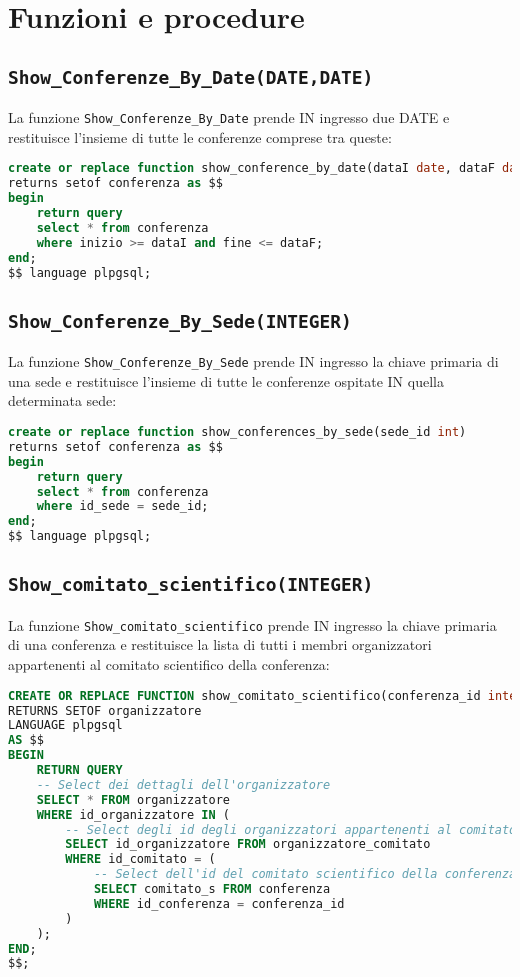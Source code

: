 \section{Funzioni e procedure}
\subsection{\texttt{Show\_Conferenze\_By\_Date(DATE,DATE)}}
La funzione \texttt{Show\_Conferenze\_By\_Date} prende IN ingresso due DATE e restituisce l'insieme di tutte le conferenze comprese tra queste:
\begin{lstlisting}[language=SQL, style=mystyle]
create or replace function show_conference_by_date(dataI date, dataF date)
returns setof conferenza as $$
begin
    return query
    select * from conferenza
    where inizio >= dataI and fine <= dataF;
end;
$$ language plpgsql;
\end{lstlisting}
\subsection{\texttt{Show\_Conferenze\_By\_Sede(INTEGER)}}
La funzione \texttt{Show\_Conferenze\_By\_Sede} prende IN ingresso la chiave primaria di una sede e restituisce l'insieme di tutte le conferenze ospitate IN quella determinata sede:
\begin{lstlisting}[language=SQL, style=mystyle]
create or replace function show_conferences_by_sede(sede_id int)
returns setof conferenza as $$
begin
    return query
    select * from conferenza
    where id_sede = sede_id;
end;
$$ language plpgsql;
\end{lstlisting}
\subsection{\texttt{Show\_comitato\_scientifico(INTEGER)}}
La funzione \texttt{Show\_comitato\_scientifico} prende IN ingresso la chiave primaria di una conferenza e restituisce la lista di tutti i membri organizzatori appartenenti al comitato scientifico della conferenza:
\begin{lstlisting}[language=SQL, style=mystyle]
CREATE OR REPLACE FUNCTION show_comitato_scientifico(conferenza_id integer)
RETURNS SETOF organizzatore
LANGUAGE plpgsql
AS $$
BEGIN
    RETURN QUERY
    -- Select dei dettagli dell'organizzatore
    SELECT * FROM organizzatore
    WHERE id_organizzatore IN (
        -- Select degli id degli organizzatori appartenenti al comitato scientifico
        SELECT id_organizzatore FROM organizzatore_comitato
        WHERE id_comitato = (
            -- Select dell'id del comitato scientifico della conferenza
            SELECT comitato_s FROM conferenza
            WHERE id_conferenza = conferenza_id
        )
    );
END;
$$;
\end{lstlisting}

